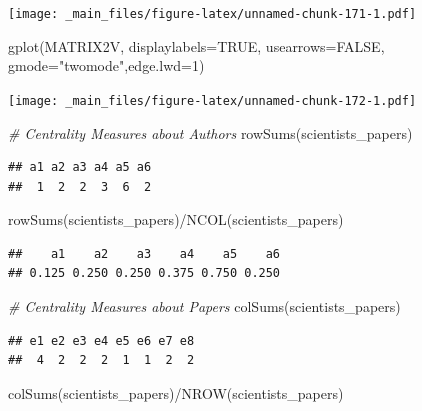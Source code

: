 \documentclass[
  notitlepage,
  onecolumn,
  openany]{book}
\newenvironment{Shaded}{\begin{snugshade}}{\end{snugshade}}
\newcommand{\AttributeTok}[1]{\textcolor[rgb]{0.77,0.63,0.00}{#1}}
\newcommand{\CommentTok}[1]{\textcolor[rgb]{0.56,0.35,0.01}{\textit{#1}}}
\newcommand{\ConstantTok}[1]{\textcolor[rgb]{0.00,0.00,0.00}{#1}}
\newcommand{\DecValTok}[1]{\textcolor[rgb]{0.00,0.00,0.81}{#1}}
\newcommand{\FunctionTok}[1]{\textcolor[rgb]{0.00,0.00,0.00}{#1}}
\newcommand{\NormalTok}[1]{#1}
\newcommand{\SpecialCharTok}[1]{\textcolor[rgb]{0.00,0.00,0.00}{#1}}
\newcommand{\StringTok}[1]{\textcolor[rgb]{0.31,0.60,0.02}{#1}}
\begin{document}
\texttt{[image: \_main\_files/figure-latex/unnamed-chunk-171-1.pdf]}

\begin{Shaded}
\begin{Highlighting}[]
\FunctionTok{gplot}\NormalTok{(MATRIX2V, }\AttributeTok{displaylabels=}\ConstantTok{TRUE}\NormalTok{, }
      \AttributeTok{usearrows=}\ConstantTok{FALSE}\NormalTok{, }\AttributeTok{gmode=}\StringTok{"twomode"}\NormalTok{,}\AttributeTok{edge.lwd=}\DecValTok{1}\NormalTok{)}
\end{Highlighting}
\end{Shaded}

\texttt{[image: \_main\_files/figure-latex/unnamed-chunk-172-1.pdf]}

\begin{Shaded}
\begin{Highlighting}[]
\CommentTok{\# Centrality Measures about Authors}
\FunctionTok{rowSums}\NormalTok{(scientists\_papers)}
\end{Highlighting}
\end{Shaded}

\begin{verbatim}
## a1 a2 a3 a4 a5 a6 
##  1  2  2  3  6  2
\end{verbatim}

\begin{Shaded}
\begin{Highlighting}[]
\FunctionTok{rowSums}\NormalTok{(scientists\_papers)}\SpecialCharTok{/}\FunctionTok{NCOL}\NormalTok{(scientists\_papers)}
\end{Highlighting}
\end{Shaded}

\begin{verbatim}
##    a1    a2    a3    a4    a5    a6 
## 0.125 0.250 0.250 0.375 0.750 0.250
\end{verbatim}

\begin{Shaded}
\begin{Highlighting}[]
\CommentTok{\# Centrality Measures about Papers}
\FunctionTok{colSums}\NormalTok{(scientists\_papers)}
\end{Highlighting}
\end{Shaded}

\begin{verbatim}
## e1 e2 e3 e4 e5 e6 e7 e8 
##  4  2  2  2  1  1  2  2
\end{verbatim}

\begin{Shaded}
\begin{Highlighting}[]
\FunctionTok{colSums}\NormalTok{(scientists\_papers)}\SpecialCharTok{/}\FunctionTok{NROW}\NormalTok{(scientists\_papers)}
\end{Highlighting}
\end{Shaded}
\end{document}
